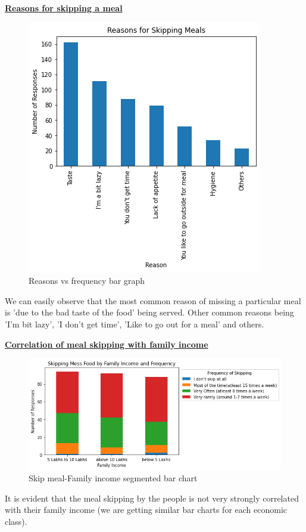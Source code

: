 \documentclass{article}
\begin{document}
\centerline{\underline{\bfseries{Reasons for skipping a meal}}}

\begin{figure}[H]
    \centering
    \includegraphics[scale = 0.7]{bar_reasons.png}
    \caption{Reasons vs frequency bar graph}  
    \label{fig:Normality_plot}
\end{figure}
We can easily observe that the most common reason of missing a particular meal is 'due to the bad taste of the food' being served. Other common reasons being 'I'm bit lazy', 'I don't get time', 'Like to go out for a meal' and others.

\centerline{\underline{\bfseries{Correlation of meal skipping with family income}}}

\begin{figure}[H]
    \centering
    \includegraphics[scale = 0.7]{Meal Skipping - Family Income Seg chart.png}
    \caption{Skip meal-Family income segmented bar chart}  
    \label{fig:Normality_plot}
\end{figure}
It is evident that the meal skipping by the people is not very strongly correlated with their family income (we are getting similar bar charts for each economic class).\\
\end{document}
